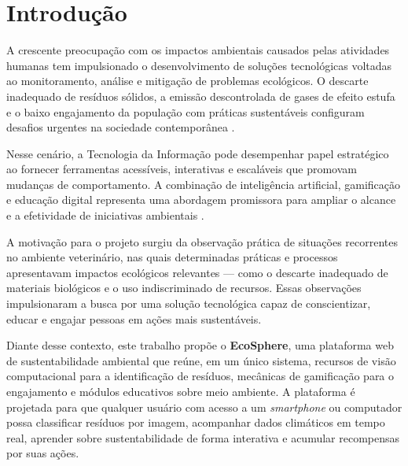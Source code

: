 \documentclass[
	12pt,
	openright,
	oneside,
	a4paper,
	chapter=TITLE,
	section=TITLE,
	subsection=TITLE,
	subsubsection=TITLE,
	english,
	brazil
	]{abntex2}
\begin{document}
\tableofcontents*
\cleardoublepage

\textual
\pagestyle{simple}
\setcounter{page}{1}

\chapter{Introdução}

A crescente preocupação com os impactos ambientais causados pelas atividades humanas tem impulsionado o desenvolvimento de soluções tecnológicas voltadas ao monitoramento, análise e mitigação de problemas ecológicos. O descarte inadequado de resíduos sólidos, a emissão descontrolada de gases de efeito estufa e o baixo engajamento da população com práticas sustentáveis configuram desafios urgentes na sociedade contemporânea \cite{PNUMA2023}.

Nesse cenário, a Tecnologia da Informação pode desempenhar papel estratégico ao fornecer ferramentas acessíveis, interativas e escaláveis que promovam mudanças de comportamento. A combinação de inteligência artificial, gamificação e educação digital representa uma abordagem promissora para ampliar o alcance e a efetividade de iniciativas ambientais \cite{DETERDING2011}.

A motivação para o projeto surgiu da observação prática de situações recorrentes no ambiente veterinário, nas quais determinadas práticas e processos apresentavam impactos ecológicos relevantes — como o descarte inadequado de materiais biológicos e o uso indiscriminado de recursos. Essas observações impulsionaram a busca por uma solução tecnológica capaz de conscientizar, educar e engajar pessoas em ações mais sustentáveis.

Diante desse contexto, este trabalho propõe o \textbf{EcoSphere}, uma plataforma web de sustentabilidade ambiental que reúne, em um único sistema, recursos de visão computacional para a identificação de resíduos, mecânicas de gamificação para o engajamento e módulos educativos sobre meio ambiente. A plataforma é projetada para que qualquer usuário com acesso a um \textit{smartphone} ou computador possa classificar resíduos por imagem, acompanhar dados climáticos em tempo real, aprender sobre sustentabilidade de forma interativa e acumular recompensas por suas ações.
\end{document}
